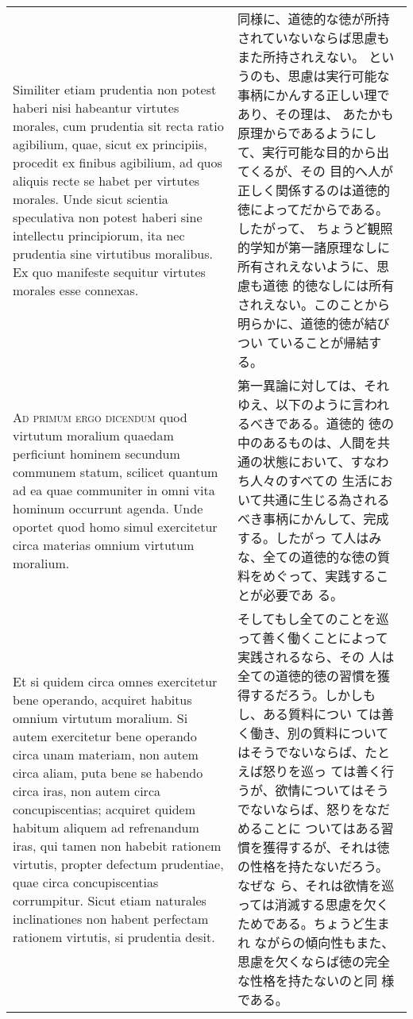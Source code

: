 \documentclass[10pt]{jsarticle}
\begin{document}
\begin{longtable}{p{21em}p{21em}}
\\

 Similiter etiam prudentia non potest haberi nisi habeantur virtutes
 morales, cum prudentia sit recta ratio agibilium, quae, sicut ex
 principiis, procedit ex finibus agibilium, ad quos aliquis recte se
 habet per virtutes morales. Unde sicut scientia speculativa non
 potest haberi sine intellectu principiorum, ita nec prudentia sine
 virtutibus moralibus. Ex quo manifeste sequitur virtutes morales esse
 connexas.

&

 同様に、道徳的な徳が所持されていないならば思慮もまた所持されえない。
 というのも、思慮は実行可能な事柄にかんする正しい理であり、その理は、
 あたかも原理からであるようにして、実行可能な目的から出てくるが、その
 目的へ人が正しく関係するのは道徳的徳によってだからである。したがって、
 ちょうど観照的学知が第一諸原理なしに所有されえないように、思慮も道徳
 的徳なしには所有されえない。このことから明らかに、道徳的徳が結びつい
 ていることが帰結する。

\\



{\scshape Ad primum ergo dicendum} quod virtutum moralium quaedam
perficiunt hominem secundum communem statum, scilicet quantum ad ea
quae communiter in omni vita hominum occurrunt agenda. Unde oportet
quod homo simul exercitetur circa materias omnium virtutum
 moralium.


&

 第一異論に対しては、それゆえ、以下のように言われるべきである。道徳的
 徳の中のあるものは、人間を共通の状態において、すなわち人々のすべての
 生活において共通に生じる為されるべき事柄にかんして、完成する。したがっ
 て人はみな、全ての道徳的な徳の質料をめぐって、実践することが必要であ
 る。
 

\\



 Et si quidem circa omnes exercitetur bene operando, acquiret habitus
omnium virtutum moralium. Si autem exercitetur bene operando circa
unam materiam, non autem circa aliam, puta bene se habendo circa iras,
non autem circa concupiscentias; acquiret quidem habitum aliquem ad
refrenandum iras, qui tamen non habebit rationem virtutis, propter
defectum prudentiae, quae circa concupiscentias corrumpitur. Sicut
etiam naturales inclinationes non habent perfectam rationem virtutis,
si prudentia desit.

&

 そしてもし全てのことを巡って善く働くことによって実践されるなら、その
 人は全ての道徳的徳の習慣を獲得するだろう。しかしもし、ある質料につい
 ては善く働き、別の質料についてはそうでないならば、たとえば怒りを巡っ
 ては善く行うが、欲情についてはそうでないならば、怒りをなだめることに
 ついてはある習慣を獲得するが、それは徳の性格を持たないだろう。なぜな
 ら、それは欲情を巡っては消滅する思慮を欠くためである。ちょうど生まれ
 ながらの傾向性もまた、思慮を欠くならば徳の完全な性格を持たないのと同
 様である。


\end{longtable}
\end{document}
